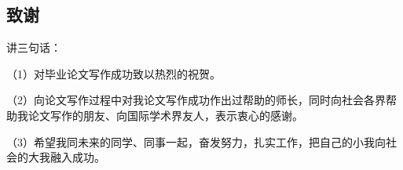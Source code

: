 \begin{ujnthanks}
\section[致谢]{致\qquad 谢}
讲三句话：

（1）对毕业论文写作成功致以热烈的祝贺。

（2）向论文写作过程中对我论文写作成功作出过帮助的师长，同时向社会各界帮助我论文写作的朋友、向国际学术界友人，表示衷心的感谢。

（3）希望我同未来的同学、同事一起，奋发努力，扎实工作，把自己的小我向社会的大我融入成功。
\end{ujnthanks}
